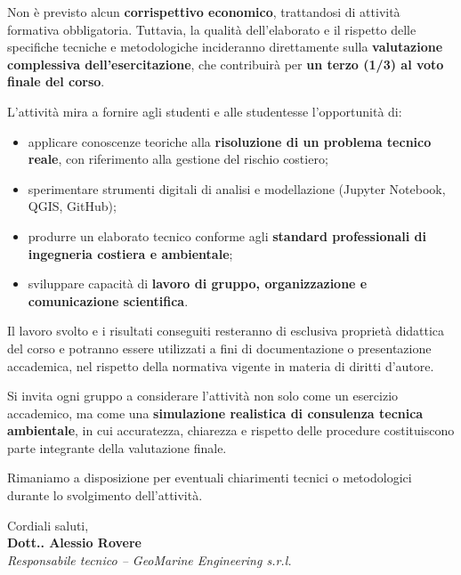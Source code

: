 \documentclass[11pt,a4paper,roman]{moderncv}
\begin{document}
Non è previsto alcun \textbf{corrispettivo economico}, trattandosi di attività formativa obbligatoria. Tuttavia, la qualità dell’elaborato e il rispetto delle specifiche tecniche e metodologiche incideranno direttamente sulla \textbf{valutazione complessiva dell’esercitazione}, che contribuirà per \textbf{un terzo (1/3) al voto finale del corso}.

L’attività mira a fornire agli studenti e alle studentesse l’opportunità di:
\begin{itemize}
  \item applicare conoscenze teoriche alla \textbf{risoluzione di un problema tecnico reale}, con riferimento alla gestione del rischio costiero;
  \item sperimentare strumenti digitali di analisi e modellazione (Jupyter Notebook, QGIS, GitHub);
  \item produrre un elaborato tecnico conforme agli \textbf{standard professionali di ingegneria costiera e ambientale};
  \item sviluppare capacità di \textbf{lavoro di gruppo, organizzazione e comunicazione scientifica}.
\end{itemize}

Il lavoro svolto e i risultati conseguiti resteranno di esclusiva proprietà didattica del corso e potranno essere utilizzati a fini di documentazione o presentazione accademica, nel rispetto della normativa vigente in materia di diritti d’autore.

Si invita ogni gruppo a considerare l’attività non solo come un esercizio accademico, ma come una \textbf{simulazione realistica di consulenza tecnica ambientale}, in cui accuratezza, chiarezza e rispetto delle procedure costituiscono parte integrante della valutazione finale.  

\vspace{1em}
Rimaniamo a disposizione per eventuali chiarimenti tecnici o metodologici durante lo svolgimento dell’attività.

\vspace{1em}
Cordiali saluti, \\[1em]
\textbf{Dott.. Alessio Rovere} \\
\textit{Responsabile tecnico – GeoMarine Engineering s.r.l.}
\end{document}
